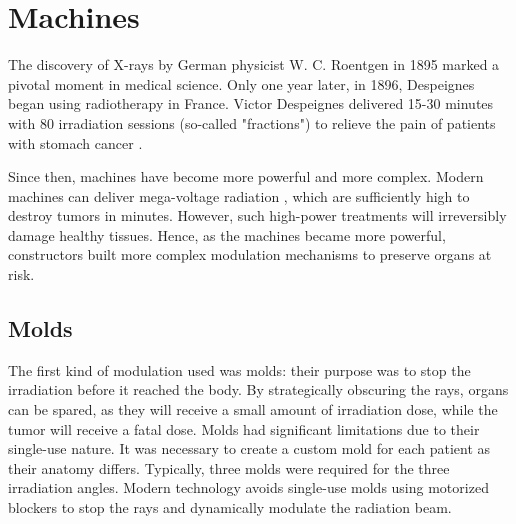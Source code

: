 


\section{Machines}
The discovery of X-rays by German physicist W. C. Roentgen in 1895 marked a pivotal moment in medical science.
Only one year later, in 1896, Despeignes began using radiotherapy in France.
Victor Despeignes delivered 15-30 minutes with 80 irradiation sessions (so-called "fractions") to relieve the pain of patients with stomach cancer \cite{Holsti1995}.

Since then, machines have become more powerful and more complex.
Modern machines can deliver mega-voltage radiation \cite{Huh2020}, which are sufficiently high to destroy tumors in minutes.
However, such high-power treatments will irreversibly damage healthy tissues.
Hence, as the machines became more powerful, constructors built more complex modulation mechanisms to preserve organs at risk.

\subsection{Molds}
The first kind of modulation used was molds: their purpose was to stop the irradiation before it reached the body.
By strategically obscuring the rays, organs can be spared, as they will receive a small amount of irradiation dose, while the tumor will receive a fatal dose.
Molds had significant limitations due to their single-use nature.
It was necessary to create a custom mold for each patient as their anatomy differs.
Typically, three molds were required for the three irradiation angles.
Modern technology avoids single-use molds using motorized blockers to stop the rays and dynamically modulate the radiation beam.

